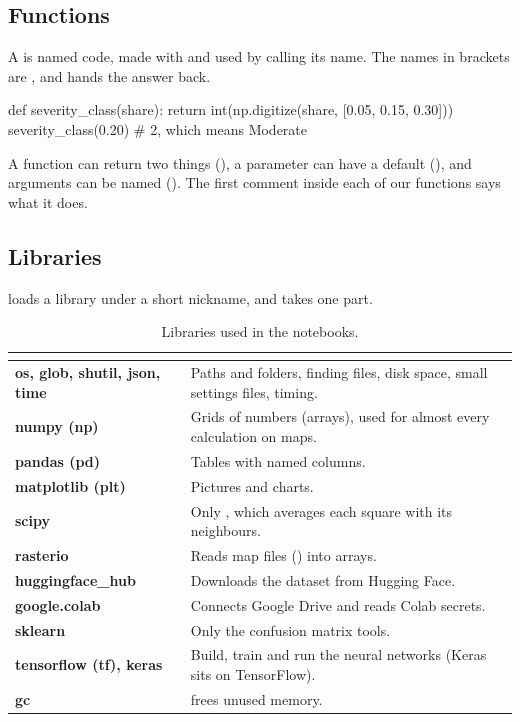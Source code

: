\subsection{Functions}\label{py:funcs}
A  is named code, made with  and used by calling its name. The names in brackets are , and  hands the answer back.
\begin{pycode}
def severity_class(share):
    return int(np.digitize(share, [0.05, 0.15, 0.30]))
severity_class(0.20)     # 2, which means Moderate
\end{pycode}
A function can return two things (), a parameter can have a default (), and arguments can be named (). The first comment inside each of our functions says what it does.

\subsection{Libraries}\label{py:imports}
 loads a library under a short nickname, and  takes one part.

\begin{table}[!htbp]
\centering\footnotesize
\caption{Libraries used in the notebooks.}
\begin{tabularx}{\linewidth}{|>{\bfseries}p{3.0cm}|Y|}
\hline
{}  & \\ \hline
os, glob, shutil, json, time & Paths and folders, finding files, disk space, small settings files, timing.\\ \hline
numpy (np) & Grids of numbers (arrays), used for almost every calculation on maps.\\ \hline
pandas (pd) & Tables with named columns.\\ \hline
matplotlib (plt) & Pictures and charts.\\ \hline
scipy & Only , which averages each square with its neighbours.\\ \hline
rasterio & Reads map files () into arrays.\\ \hline
huggingface\_hub & Downloads the dataset from Hugging Face.\\ \hline
google.colab & Connects Google Drive and reads Colab secrets.\\ \hline
sklearn & Only the confusion matrix tools.\\ \hline
tensorflow (tf), keras & Build, train and run the neural networks (Keras sits on TensorFlow).\\ \hline
gc &  frees unused memory.\\ \hline
\end{tabularx}
\end{table}

